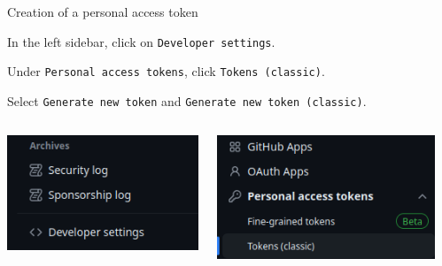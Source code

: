 \documentclass[10pt]{beamer}
\begin{document}
\begin{frame}[fragile]{Creation of a personal access token}
\protect\hypertarget{creation-of-a-personal-access-token-1}{}

In the left sidebar, click on \texttt{Developer\ settings}.

Under \texttt{Personal\ access\ tokens}, click
\texttt{Tokens\ (classic)}.

Select \texttt{Generate\ new\ token} and
\texttt{Generate\ new\ token\ (classic)}.

\begin{columns}
\begin{column}{0.3\textwidth}
    \begin{center}
     \includegraphics[width=\textwidth]{img/access-token-4.png}
     \end{center}
\end{column}
\begin{column}{0.3\textwidth}
    \begin{center}
     \includegraphics[width=\textwidth]{img/access-token-1.png}
     \end{center}
\end{column}
\begin{column}{0.3\textwidth}
    \begin{center}


\end{center}
\end{column}
\end{columns}
\end{frame}
\end{document}
